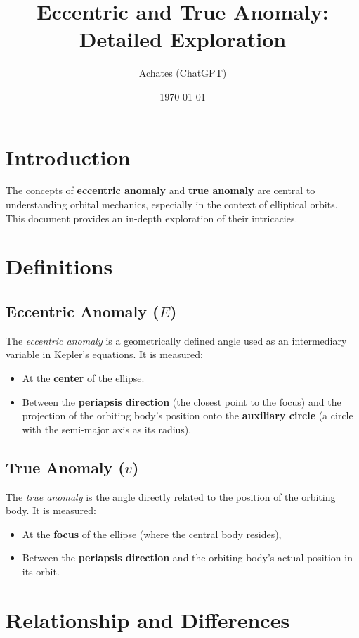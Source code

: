 \documentclass[11pt]{article}
\title{Eccentric and True Anomaly: Detailed Exploration}
\author{Achates (ChatGPT)}
\date{\today}
\begin{document}
\maketitle

\section*{Introduction}
The concepts of \textbf{eccentric anomaly} and \textbf{true anomaly} are central to understanding orbital mechanics, especially in the context of elliptical orbits. This document provides an in-depth exploration of their intricacies.

\section*{Definitions}
\subsection*{Eccentric Anomaly (\(E\))}
The \textit{eccentric anomaly} is a geometrically defined angle used as an intermediary variable in Kepler's equations. It is measured:
\begin{itemize}
    \item At the \textbf{center} of the ellipse.
    \item Between the \textbf{periapsis direction} (the closest point to the focus) and the projection of the orbiting body's position onto the \textbf{auxiliary circle} (a circle with the semi-major axis as its radius).
\end{itemize}

\subsection*{True Anomaly (\(v\))}
The \textit{true anomaly} is the angle directly related to the position of the orbiting body. It is measured:
\begin{itemize}
    \item At the \textbf{focus} of the ellipse (where the central body resides),
    \item Between the \textbf{periapsis direction} and the orbiting body's actual position in its orbit.
\end{itemize}

\section*{Relationship and Differences}
\end{document}
